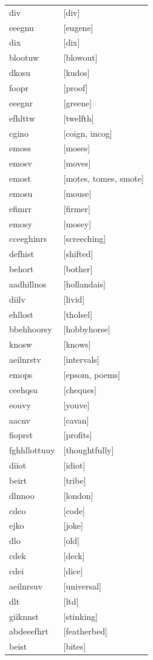 \documentclass{article}
\begin{document}
\begin{tabular}{ll}
div & [div] \\
eeegnu & [eugene] \\
dix & [dix] \\
blootuw & [blowout] \\
dkosu & [kudos] \\
foopr & [proof] \\
eeegnr & [greene] \\
efhlttw & [twelfth] \\
cgino & [coign, incog] \\
emoss & [moses] \\
emosv & [moves] \\
emost & [motes, tomes, smote] \\
emosu & [mouse] \\
efimrr & [firmer] \\
emosy & [mosey] \\
cceeghinrs & [screeching] \\
defhist & [shifted] \\
behort & [bother] \\
aadhillnos & [hollandais] \\
diilv & [livid] \\
ehllost & [tholsel] \\
bbehhoorsy & [hobbyhorse] \\
knosw & [knows] \\
aeilnrstv & [intervals] \\
emops & [epsom, poems] \\
ceehqsu & [cheques] \\
eouvy & [youve] \\
aacnv & [cavan] \\
fioprst & [profits] \\
fghhllottuuy & [thoughtfully] \\
diiot & [idiot] \\
beirt & [tribe] \\
dlnnoo & [london] \\
cdeo & [code] \\
ejko & [joke] \\
dlo & [old] \\
cdek & [deck] \\
cdei & [dice] \\
aeilnrsuv & [universal] \\
dlt & [ltd] \\
giiknnst & [stinking] \\
abdeeefhrt & [featherbed] \\
beist & [bites] \\

\end{tabular}
\end{document}
